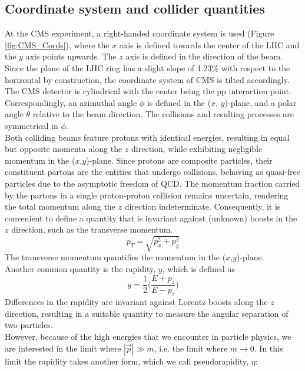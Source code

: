 \subsection{\label{sec:exp_CMS_cords}Coordinate system and collider quantities}
\noindent At the CMS experiment, a right-handed coordinate system is used (Figure \ref{fig:CMS_Cords}), where the $x$ axis is defined towards the center of the LHC and the $y$ axis points upwards. The $z$ axis is defined in the direction of the beam. Since the plane of the LHC ring has a slight slope of 1.23\% with respect to the horizontal by construction, the coordinate system of CMS is tilted accordingly. The CMS detector is cylindrical with the center being the pp interaction point. Correspondingly, an azimuthal angle $\phi$ is defined in the ($x$, $y$)-plane, and a polar angle $\theta$ relative to the beam direction. The collisions and resulting processes are symmetrical in $\phi$.\\
\indent Both colliding beams feature protons with identical energies, resulting in equal but opposite momenta along the $z$ direction, while exhibiting negligible momentum in the ($x$,$y$)-plane. Since protons are composite particles, their constituent partons are the entities that undergo collisions, behaving as quasi-free particles due to the asymptotic freedom of QCD. The momentum fraction carried by the partons in a single proton-proton collision remains uncertain, rendering the total momentum along the $z$ direction indeterminate. Consequently, it is convenient to define a quantity that is invariant against (unknown) boosts in the $z$ direction, such as the transverse momentum.
\begin{equation}
    p_T = \sqrt{p_x^2 +p_y^2}
\end{equation}
The transverse momentum quantifies the momentum in the ($x$,$y$)-plane.\\
\indent Another common quantity is the rapidity, $y$, which is defined as
\begin{equation}
    y = \frac{1}{2} \bigg( \frac{E+p_z}{E-p_z}\bigg)
\end{equation}
Differences in the rapidity are invariant against Lorentz boosts along the $z$ direction, resulting in a suitable quantity to measure the angular separation of two particles. \\
\indent However, because of the high energies that we encounter  in particle physics, we are interested in the limit where  $|\vec{p}|  \gg m$, i.e. the limit where $m \rightarrow 0$. In this limit the rapidity takes another form, which we call pseudorapidity, $\eta$:
